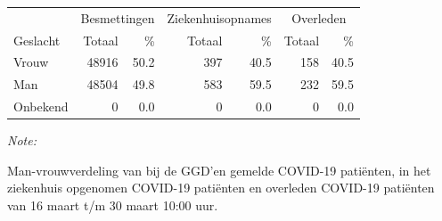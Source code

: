 \documentclass[
  english,
  man,floatsintext]{apa6}
\begin{document}
\begin{table}
\centering\begingroup\fontsize{11}{13}\selectfont

\begin{threeparttable}
\begin{tabular}{lrrrrrr}
\toprule
\multicolumn{1}{c}{ } & \multicolumn{2}{c}{Besmettingen} & \multicolumn{2}{c}{Ziekenhuisopnames} & \multicolumn{2}{c}{Overleden} \\
\cmidrule(l{3pt}r{3pt}){2-3} \cmidrule(l{3pt}r{3pt}){4-5} \cmidrule(l{3pt}r{3pt}){6-7}
Geslacht & Totaal & \% & Totaal & \% & Totaal & \%\\
\midrule
Vrouw & 48916 & 50.2 & 397 & 40.5 & 158 & 40.5\\
Man & 48504 & 49.8 & 583 & 59.5 & 232 & 59.5\\
Onbekend & 0 & 0.0 & 0 & 0.0 & 0 & 0.0\\
\bottomrule
\end{tabular}
\begin{tablenotes}
\item \textit{Note: } 
\item Man-vrouwverdeling van bij de GGD’en gemelde COVID-19 patiënten, in het ziekenhuis opgenomen COVID-19 patiënten en overleden COVID-19 patiënten van 16 maart t/m 30 maart 10:00 uur.
\end{tablenotes}
\end{threeparttable}
\endgroup{}
\end{table}
\newpage
\end{document}
